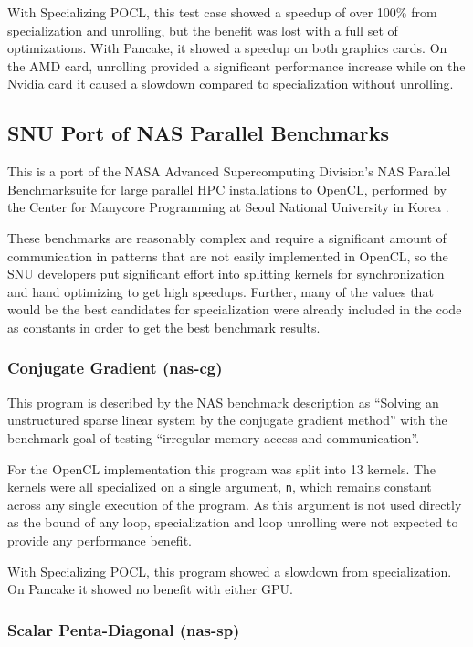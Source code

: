 \documentclass{acm_proc_article-sp}
\begin{document}
With Specializing POCL, this test case showed a speedup of over 100\% from
specialization and unrolling, but the benefit was lost with a full set of
optimizations. With Pancake, it showed a speedup on both graphics cards. On the
AMD card, unrolling provided a significant performance increase while on the
Nvidia card it caused a slowdown compared to specialization without unrolling.

\subsection{SNU Port of NAS Parallel Benchmarks}

This is a port of the NASA Advanced Supercomputing Division's NAS Parallel
Benchmarksuite for large parallel HPC installations to OpenCL, performed by the
Center for Manycore Programming at Seoul National University in Korea
\cite{Van:2002:NAS}\cite{Seo:2011:NASPerf}.

These benchmarks are reasonably complex and require a significant amount of
communication in patterns that are not easily implemented in OpenCL, so the SNU
developers put significant effort into splitting kernels for synchronization
and hand optimizing to get high speedups. Further, many of the values that
would be the best candidates for specialization were already included in the
code as constants in order to get the best benchmark results. 

\subsubsection{Conjugate Gradient (nas-cg)}

This program is described by the NAS benchmark description as ``Solving an
unstructured sparse linear system by the conjugate gradient method'' with the
benchmark goal of testing ``irregular memory access and communication''.

For the OpenCL implementation this program was split into 13 kernels. The
kernels were all specialized on a single argument, {\tt n}, which remains
constant across any single execution of the program. As this argument is not
used directly as the bound of any loop, specialization and loop unrolling were
not expected to provide any performance benefit.

With Specializing POCL, this program showed a slowdown from specialization. On
Pancake it showed no benefit with either GPU.

\subsubsection{Scalar Penta-Diagonal (nas-sp)}
\end{document}
